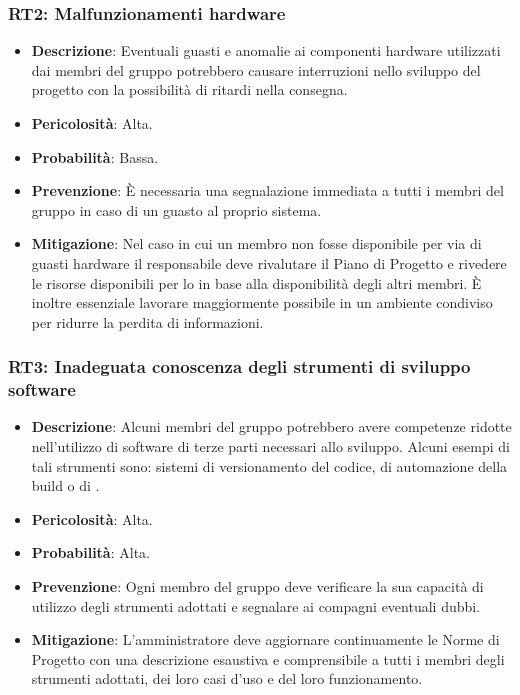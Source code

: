 \subsubsection{RT2: Malfunzionamenti hardware}
\begin{itemize}
    \item \textbf{Descrizione}: Eventuali guasti e anomalie ai componenti hardware utilizzati dai membri del gruppo potrebbero causare 
    interruzioni nello sviluppo del progetto con la possibilità di ritardi nella consegna.
    \item \textbf{Pericolosità}: Alta.
    \item \textbf{Probabilità}: Bassa.
    \item \textbf{Prevenzione}: È necessaria una segnalazione immediata a tutti i membri del gruppo in caso di un guasto al proprio sistema.
    \item \textbf{Mitigazione}: Nel caso in cui un membro non fosse disponibile per via di guasti hardware il responsabile deve  rivalutare il Piano di Progetto e rivedere le risorse disponibili per lo  in base alla disponibilità degli altri membri.
    È inoltre essenziale lavorare maggiormente possibile in un ambiente condiviso per ridurre la perdita di informazioni.
\end{itemize}

\subsubsection{RT3: Inadeguata conoscenza degli strumenti di sviluppo software}
\begin{itemize}
    \item \textbf{Descrizione}: Alcuni membri del gruppo potrebbero avere competenze ridotte nell'utilizzo di software di terze parti necessari allo sviluppo.
    Alcuni esempi di tali strumenti sono: sistemi di versionamento del codice, di automazione della build o di . 
    \item \textbf{Pericolosità}: Alta.
    \item \textbf{Probabilità}: Alta.
    \item \textbf{Prevenzione}: Ogni membro del gruppo deve verificare la sua capacità di utilizzo degli strumenti adottati e segnalare ai compagni eventuali dubbi.
    \item \textbf{Mitigazione}: L'amministratore deve aggiornare continuamente le Norme di Progetto con una descrizione esaustiva e comprensibile a tutti i membri degli strumenti adottati, dei loro casi d'uso e del loro funzionamento.
\end{itemize}

